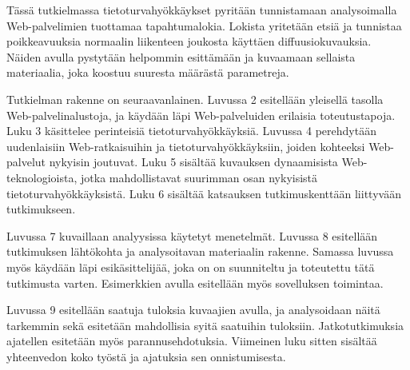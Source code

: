 Tässä tutkielmassa tietoturvahyökkäykset pyritään tunnistamaan analysoimalla 
Web-palvelimien tuottamaa tapahtumalokia. Lokista yritetään etsiä ja tunnistaa
poikkeavuuksia normaalin liikenteen joukosta käyttäen diffuusiokuvauksia. Näiden
avulla pystytään helpommin esittämään ja kuvaamaan sellaista materiaalia, joka 
koostuu suuresta määrästä parametreja.

Tutkielman rakenne on seuraavanlainen. Luvussa 2 esitellään yleisellä
tasolla Web-palvelinalustoja, ja käydään läpi Web-palveluiden
erilaisia toteutustapoja. Luku 3 käsittelee perinteisiä
tietoturvahyökkäyksiä. Luvussa 4 perehdytään uudenlaisiin
Web-ratkaisuihin ja tietoturvahyökkäyksiin, joiden kohteeksi
Web-palvelut nykyisin joutuvat.  Luku 5 sisältää kuvauksen
dynaamisista Web-teknologioista, jotka mahdollistavat suurimman osan
nykyisistä tietoturvahyökkäyksistä. Luku 6 sisältää katsauksen
tutkimuskenttään liittyvään tutkimukseen.

Luvussa 7 kuvaillaan analyysissa käytetyt menetelmät. Luvussa 8
esitellään tutkimuksen lähtökohta ja analysoitavan materiaalin rakenne.
Samassa luvussa myös käydään läpi esikäsittelijää, joka on on suunniteltu 
ja toteutettu tätä tutkimusta varten. Esimerkkien avulla esitellään myös 
sovelluksen toimintaa.

Luvussa 9 esitellään saatuja tuloksia kuvaajien avulla, ja
analysoidaan näitä tarkemmin sekä esitetään mahdollisia syitä
saatuihin tuloksiin. Jatkotutkimuksia ajatellen esitetään
myös parannusehdotuksia. Viimeinen luku sitten sisältää
yhteenvedon koko työstä ja ajatuksia sen onnistumisesta.
